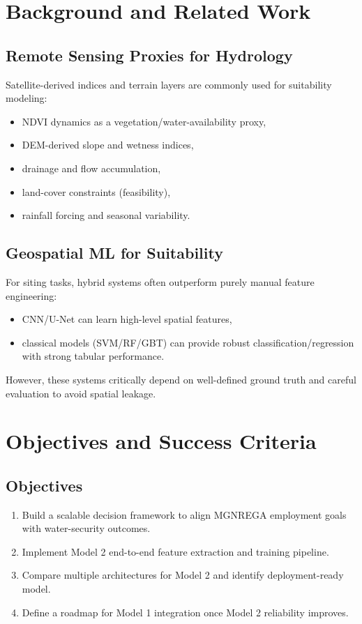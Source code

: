 \documentclass[12pt,a4paper]{report}
\begin{document}
\chapter{Background and Related Work}

\section{Remote Sensing Proxies for Hydrology}
Satellite-derived indices and terrain layers are commonly used for suitability modeling:
\begin{itemize}
  \item NDVI dynamics as a vegetation/water-availability proxy,
  \item DEM-derived slope and wetness indices,
  \item drainage and flow accumulation,
  \item land-cover constraints (feasibility),
  \item rainfall forcing and seasonal variability.
\end{itemize}

\section{Geospatial ML for Suitability}
For siting tasks, hybrid systems often outperform purely manual feature engineering:
\begin{itemize}
  \item CNN/U-Net can learn high-level spatial features,
  \item classical models (SVM/RF/GBT) can provide robust classification/regression with strong tabular performance.
\end{itemize}
However, these systems critically depend on well-defined ground truth and careful evaluation to avoid spatial leakage.

\chapter{Objectives and Success Criteria}

\section{Objectives}
\begin{enumerate}[label=\textbf{O\arabic*.}]
  \item Build a scalable decision framework to align MGNREGA employment goals with water-security outcomes.
  \item Implement Model 2 end-to-end feature extraction and training pipeline.
  \item Compare multiple architectures for Model 2 and identify deployment-ready model.
  \item Define a roadmap for Model 1 integration once Model 2 reliability improves.
\end{enumerate}
\end{document}
